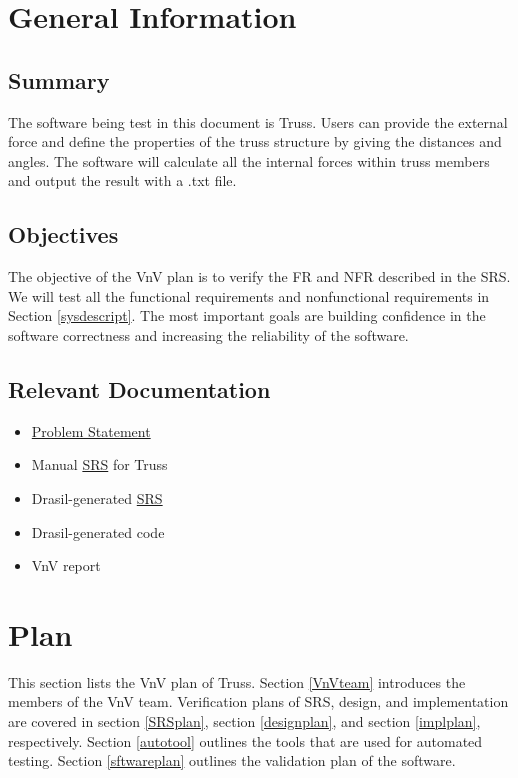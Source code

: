 \documentclass[12pt, titlepage]{article}
\begin{document}
\section{General Information} \label{Geninf}

\subsection{Summary}

The software being test in this document is Truss. Users can provide the 
external force and define the properties of the truss structure by giving the 
distances and angles. The software will calculate all the internal forces 
within truss members and output the result with a .txt file. 


\subsection{Objectives}
The objective of the VnV plan is to verify the FR and NFR described in the SRS. 
We will test all the functional requirements and nonfunctional requirements in 
Section \ref{sysdescript}. The most important goals are building confidence 
in the software correctness and increasing the reliability of the software. 

\subsection{Relevant Documentation}

\begin{itemize}
	\item 
	\href{https://github.com/tingyuw/cas741/blob/master/docs/ProblemStatement/ProblemStatement.pdf}{Problem
	 Statement}
	\item Manual
	\href{https://github.com/tingyuw/cas741/blob/master/docs/SRS/SRS.pdf}{SRS} 
	for Truss
	\item Drasil-generated 
	\href{https://github.com/tingyuw/cas741/tree/master/docs/Drasil}{SRS}
	\item Drasil-generated code
	\item VnV report
\end{itemize}


\section{Plan} \label{verplan}
This section lists the VnV plan of Truss. Section \ref{VnVteam} introduces the 
members of the VnV team. Verification plans of SRS, design, and implementation 
are covered in section \ref{SRSplan}, section \ref{designplan}, and section 
\ref{implplan}, respectively. Section \ref{autotool} outlines the tools that 
are used for automated testing. Section \ref{sftwareplan} outlines the 
validation plan of the software.
\end{document}
